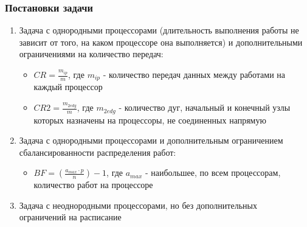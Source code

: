 \documentclass[hyperref=unicode, aspectratio=169]{beamer}
\begin{document}
\begin{frame}
    \frametitle{Постановки задачи}
    \begin{enumerate}
        \item Задача с однородными процессорами (длительность выполнения работы не зависит от того, на каком процессоре она выполняется) и дополнительными ограничениями на количество передач:
              \begin{itemize}
                  \item $CR = \frac{m_{ip}}{m}$, где $m_{ip}$ - количество передач данных между работами на каждый процессор
                        \vspace{5pt}
                  \item $CR2 = \frac{m_{2edg}}{m}$, где $m_{2edg}$ - количество дуг, начальный и конечный узлы которых назначены на процессоры, не соединенных напрямую
              \end{itemize}
        \item Задача с однородными процессорами и дополнительным ограничением сбалансированности распределения работ:
              \begin{itemize}
                  \item $BF = \left( \frac{a_{max} \cdot p}{n} \right) - 1$, где $a_{max}$ - наибольшее, по всем процессорам, количество работ на процессоре
              \end{itemize}
        \item Задача с неоднородными процессорами, но без дополнительных \\ограничений на расписание
    \end{enumerate}
\end{frame}
\end{document}
